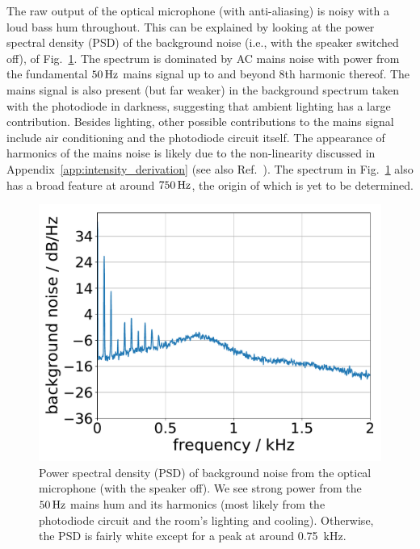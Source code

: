 \documentclass[paper-main.tex]{subfiles}
\begin{document}
The raw output of the optical microphone (with anti-aliasing) is noisy with a loud bass hum throughout. 
This can be explained by looking at the power spectral density (PSD) of the background noise (i.e., with the speaker switched off),  of Fig.~\ref{fig:psd_noise}. 
The spectrum is dominated by AC mains noise with power from the fundamental $50\,{\rm Hz}$ mains signal up to and beyond $8$th harmonic thereof. 
The mains signal is also present (but far weaker) in the background spectrum taken with the photodiode in darkness, suggesting that ambient lighting has a large contribution. 
Besides lighting, other possible contributions to the mains signal include air conditioning and the photodiode circuit itself. 
The appearance of harmonics of the mains noise is likely due to the non-linearity discussed in Appendix~\ref{app:intensity_derivation} (see also Ref.~\cite{feynman}). 
The spectrum in Fig.~\ref{fig:psd_noise} also has a broad feature at around $750\,{\rm Hz}$, the origin of which is yet to be determined.


\begin{figure}
	\includegraphics[width=.45\textwidth]{figures/psd_podo_14_6.pdf}
	\caption{\label{fig:psd_noise}
Power spectral density (PSD) of background noise from the optical microphone (with the speaker off). 
We see strong power from the $50\,{\rm Hz}$ mains hum and its harmonics (most likely from the photodiode circuit and the room’s lighting and cooling). Otherwise, the PSD is fairly white except for a peak at around 0.75~kHz. 
}
\end{figure}
\end{document}
